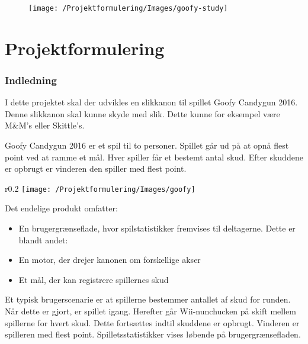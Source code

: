 \frontmatter
\maketitle
\AddToShipoutPicture*{\BackgroundPic}
\newpage

\tableofcontents
\begin{figure}[h]
	\texttt{[image: /Projektformulering/Images/goofy-study]}
\end{figure}
\newpage
\listoffigures
\newpage

\mainmatter


\chapter{Projektformulering}
\subsection{Indledning}
I dette projektet skal der udvikles en slikkanon til spillet Goofy Candygun 2016. Denne slikkanon skal kunne skyde med slik. Dette kunne for eksempel være M\&M’s eller Skittle’s.

Goofy Candygun 2016 er et spil til to personer. Spillet går ud på at opnå flest point ved at ramme et mål. Hver spiller får et bestemt antal skud. Efter skuddene er opbrugt er vinderen den spiller med flest point.
\begin{wrapfigure}{r}{0.2\textwidth}
	\texttt{[image: /Projektformulering/Images/goofy]}
\end{wrapfigure}

Det endelige produkt omfatter:
\begin{itemize}
	\item{En brugergrænseflade, hvor spilstatistikker fremvises til deltagerne. Dette er blandt andet:}
	\item{En motor, der drejer kanonen om forskellige akser}
	\item{Et mål, der kan registrere spillernes skud}
\end{itemize}

Et typisk brugerscenarie er at spillerne bestemmer antallet af skud for runden. Når dette er gjort, er spillet igang. Herefter går Wii-nunchucken på skift mellem spillerne for hvert skud. Dette fortsættes indtil skuddene er opbrugt. Vinderen er spilleren med flest point. Spilletsstatistikker vises løbende på brugergrænsefladen. 


